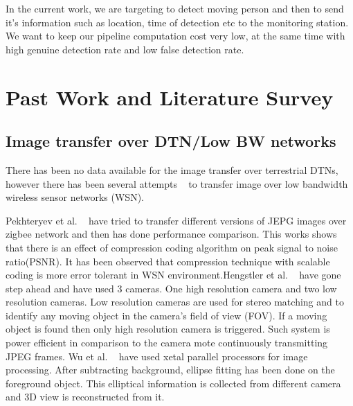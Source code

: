 In the current work, we are targeting to detect moving person and
then to send it's information such as location, time of detection etc to
the monitoring station. We want to keep our pipeline computation cost
very low, at the same time with high genuine detection rate and low
false detection rate.

\pagebreak


\section{Past Work and Literature Survey}

\subsection{Image transfer over DTN/Low BW networks}

There has been no data available for the image transfer over terrestrial
DTNs, however there has been several attempts ~\cite{2, 3, 4, 5} to transfer
image over low bandwidth wireless sensor networks (WSN).

Pekhteryev et al. ~\cite{2} have tried to transfer different versions of JEPG
images over zigbee network and then has done performance comparison.
This works shows that there is an effect of compression coding algorithm
on peak signal to noise ratio(PSNR). It has been observed that
compression technique with scalable coding is more error tolerant in WSN
environment.Hengstler et al. ~\cite{3, 5} have gone step ahead and have used 3
cameras. One high resolution camera and two low resolution cameras. Low
resolution cameras are used for stereo matching and to identify any
moving object in the camera's field of view (FOV). If a moving object is
found then only high resolution camera is triggered. Such system is
power efficient in  comparison to the camera mote continuously
transmitting JPEG frames. Wu et al. ~\cite{4} have used xetal parallel
processors for image processing. After subtracting background, ellipse
fitting has been done on the foreground object. This elliptical
information is collected from different camera and 3D view is
reconstructed from it. 

\pagebreak


